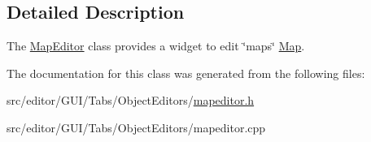 \subsection{\-Detailed \-Description}
\-The \hyperlink{class_map_editor}{\-Map\-Editor} class provides a widget to edit \char`\"{}maps\char`\"{} \hyperlink{class_map}{\-Map}. 

\-The documentation for this class was generated from the following files\-:\begin{DoxyCompactItemize}
\item 
src/editor/\-G\-U\-I/\-Tabs/\-Object\-Editors/\hyperlink{mapeditor_8h}{mapeditor.\-h}\item 
src/editor/\-G\-U\-I/\-Tabs/\-Object\-Editors/mapeditor.\-cpp\end{DoxyCompactItemize}

